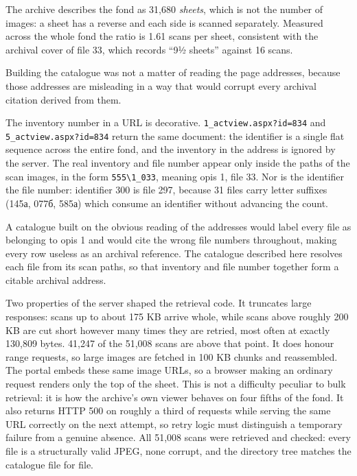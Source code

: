 \documentclass[11pt,a4paper]{article}
\begin{document}
The archive describes the fond as 31,680 \emph{sheets}, which is not the number of
images: a sheet has a reverse and each side is scanned separately. Measured
across the whole fond the ratio is 1.61 scans per sheet, consistent with the
archival cover of file 33, which records ``9½ sheets'' against 16 scans.

Building the catalogue was not a matter of reading the page addresses, because
those addresses are misleading in a way that would corrupt every archival
citation derived from them.

The inventory number in a URL is decorative. \texttt{1\_actview.aspx?id=834} and
\texttt{5\_actview.aspx?id=834} return the same document: the identifier is a single
flat sequence across the entire fond, and the inventory in the address is
ignored by the server. The real inventory and file number appear only inside
the paths of the scan images, in the form \texttt{555\textbackslash{}1\_033}, meaning opis 1, file
33. Nor is the identifier the file number: identifier 300 is file 297, because
31 files carry letter suffixes (145а, 077б, 585а) which consume an identifier
without advancing the count.

A catalogue built on the obvious reading of the addresses would label every
file as belonging to opis 1 and would cite the wrong file numbers throughout,
making every row useless as an archival reference. The catalogue described
here resolves each file from its scan paths, so that inventory and file number
together form a citable archival address.

Two properties of the server shaped the retrieval code. It truncates large
responses: scans up to about 175 KB arrive whole, while scans above roughly
200 KB are cut short however many times they are retried, most often at
exactly 130,809 bytes. 41,247 of the 51,008 scans are above that point. It
does honour range requests, so large images are fetched in 100 KB chunks and
reassembled. The portal embeds these same image URLs, so a browser making an
ordinary request renders only the top of the sheet. This is not a difficulty
peculiar to bulk retrieval: it is how the archive's own viewer behaves on four
fifths of the fond. It also returns HTTP 500 on roughly a third of requests
while serving the same URL correctly on the next attempt, so retry logic must
distinguish a temporary failure from a genuine absence. All 51,008 scans were
retrieved and checked: every file is a structurally valid JPEG, none corrupt,
and the directory tree matches the catalogue file for file.
\end{document}
